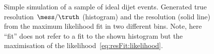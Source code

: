 \documentclass[a4paper]{cmspaper} %
\begin{document}
\begin{figure}[ht]
  \begin{center}
     
  \end{center}
  \caption{Simple simulation of a sample of ideal dijet events.
    Generated true resolution \mbox{$\mess / \truth$} (histogram) and the resolution (solid line) from the maximum likelihood fit in two different \truth bins.
    Note, here ``fit'' does not refer to a fit to the shown histogram but the maximisation of the likelihood~\eqref{eq:resFit:likelihood}.
  }
  \label{fig:resFit:toyMC:ptGenCuts:reso}
\end{figure}
\end{document}
